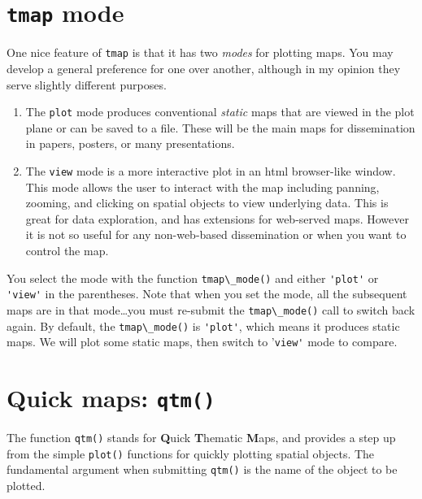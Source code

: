 \documentclass[
]{book}
\newcommand{\passthrough}[1]{#1}
\providecommand{\tightlist}{%
  \setlength{\itemsep}{0pt}\setlength{\parskip}{0pt}}
\begin{document}
\hypertarget{tmap-mode}{%
\section{\texorpdfstring{\texttt{tmap} mode}{tmap mode}}\label{tmap-mode}}

One nice feature of \passthrough{\lstinline!tmap!} is that it has two \emph{modes} for plotting maps. You may develop a general preference for one over another, although in my opinion they serve slightly different purposes.

\begin{enumerate}
\def\labelenumi{\arabic{enumi}.}
\tightlist
\item
  The \passthrough{\lstinline!plot!} mode produces conventional \emph{static} maps that are viewed in the plot plane or can be saved to a file. These will be the main maps for dissemination in papers, posters, or many presentations.
\item
  The \passthrough{\lstinline!view!} mode is a more interactive plot in an html browser-like window. This mode allows the user to interact with the map including panning, zooming, and clicking on spatial objects to view underlying data. This is great for data exploration, and has extensions for web-served maps. However it is not so useful for any non-web-based dissemination or when you want to control the map.
\end{enumerate}

You select the mode with the function \passthrough{\lstinline!tmap\_mode()!} and either \passthrough{\lstinline!'plot'!} or \passthrough{\lstinline!'view'!} in the parentheses. Note that when you set the mode, all the subsequent maps are in that mode\ldots you must re-submit the \passthrough{\lstinline!tmap\_mode()!} call to switch back again. By default, the \passthrough{\lstinline!tmap\_mode()!} is \passthrough{\lstinline!'plot'!}, which means it produces static maps. We will plot some static maps, then switch to '\passthrough{\lstinline!view'!} mode to compare.

\hypertarget{qtm}{%
\section{\texorpdfstring{Quick maps: \texttt{qtm()}}{Quick maps: qtm()}}\label{qtm}}

The function \passthrough{\lstinline!qtm()!} stands for \textbf{Q}uick \textbf{T}hematic \textbf{M}aps, and provides a step up from the simple \passthrough{\lstinline!plot()!} functions for quickly plotting spatial objects. The fundamental argument when submitting \passthrough{\lstinline!qtm()!} is the name of the object to be plotted.
\end{document}

